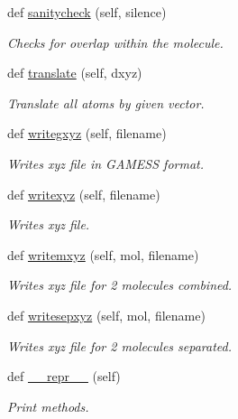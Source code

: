 \begin{DoxyCompactItemize}
def \hyperlink{classmolSimplify_1_1Classes_1_1mol3D_1_1mol3D_af79c7b686fca67c122bb1e0507f845a6}{sanitycheck} (self, silence)
\begin{DoxyCompactList}\small\item\em Checks for overlap within the molecule. \end{DoxyCompactList}\item 
def \hyperlink{classmolSimplify_1_1Classes_1_1mol3D_1_1mol3D_a27bd691cb90ab44c3acc746dc637baed}{translate} (self, dxyz)
\begin{DoxyCompactList}\small\item\em Translate all atoms by given vector. \end{DoxyCompactList}\item 
def \hyperlink{classmolSimplify_1_1Classes_1_1mol3D_1_1mol3D_a773c0ca887457100e8034a8eacc28103}{writegxyz} (self, filename)
\begin{DoxyCompactList}\small\item\em Writes xyz file in G\+A\+M\+E\+SS format. \end{DoxyCompactList}\item 
def \hyperlink{classmolSimplify_1_1Classes_1_1mol3D_1_1mol3D_a9d338e17fae1e6f4d7a9012a76844e7c}{writexyz} (self, filename)
\begin{DoxyCompactList}\small\item\em Writes xyz file. \end{DoxyCompactList}\item 
def \hyperlink{classmolSimplify_1_1Classes_1_1mol3D_1_1mol3D_a21f8c2e9da6a3f0ec19120c00700f32b}{writemxyz} (self, mol, filename)
\begin{DoxyCompactList}\small\item\em Writes xyz file for 2 molecules combined. \end{DoxyCompactList}\item 
def \hyperlink{classmolSimplify_1_1Classes_1_1mol3D_1_1mol3D_a7448ad5d35a2801d08a05c3b5eea4835}{writesepxyz} (self, mol, filename)
\begin{DoxyCompactList}\small\item\em Writes xyz file for 2 molecules separated. \end{DoxyCompactList}\item 
def \hyperlink{classmolSimplify_1_1Classes_1_1mol3D_1_1mol3D_ac5a779ac0e20d07b60dc30fdb9a0f4d1}{\+\_\+\+\_\+repr\+\_\+\+\_\+} (self)
\begin{DoxyCompactList}\small\item\em Print methods. \end{DoxyCompactList}\end{DoxyCompactItemize}
